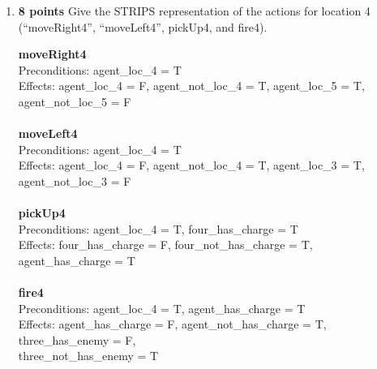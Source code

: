 \documentclass{article}
\def\ans#1{{\color{ans}#1}}
\begin{document}
\begin{enumerate}[label=(\alph*)]
    \item \textbf{8 points} Give the STRIPS representation of the actions for location 4 (“moveRight4”, “moveLeft4”,
pickUp4, and fire4). 

\ans{
        \textbf{moveRight4}\\
        Preconditions:  agent\_loc\_4 = T\\
        Effects: agent\_loc\_4 = F,  agent\_not\_loc\_4 = T,   agent\_loc\_5 = T, 					agent\_not\_loc\_5 = F\\\\
        \textbf{moveLeft4}\\
        Preconditions:  agent\_loc\_4 = T \\
        Effects: agent\_loc\_4 = F,  agent\_not\_loc\_4 = T,   agent\_loc\_3 = T, 					agent\_not\_loc\_3 = F\\\\
        \textbf{pickUp4}\\
        Preconditions:  agent\_loc\_4 = T, four\_has\_charge = T\\
        Effects: four\_has\_charge = F, four\_not\_has\_charge = T, 				   						agent\_has\_charge = T \\\\
        \textbf{fire4}\\
        Preconditions: agent\_loc\_4 = T, agent\_has\_charge = T \\
        Effects: agent\_has\_charge = F,  agent\_not\_has\_charge = T, 					  				three\_has\_enemy = F,\\ three\_not\_has\_enemy = T	 \\\\
    }  \\


\end{enumerate}
\end{document}
